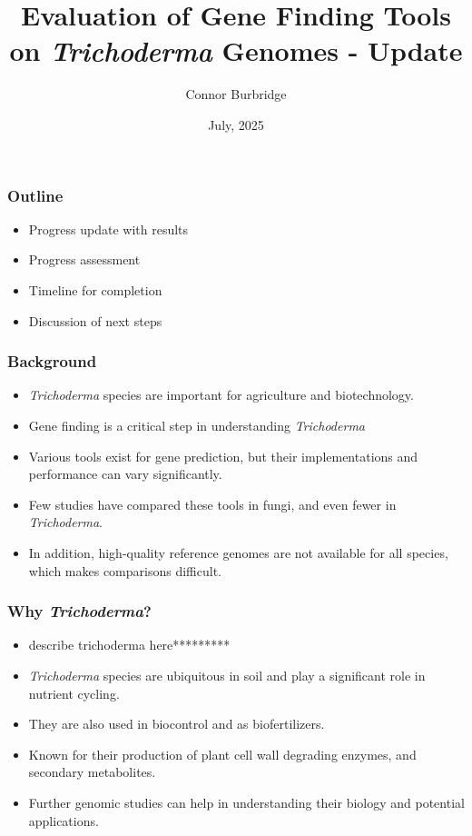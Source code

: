 \documentclass[t]{beamer}
\title{Evaluation of Gene Finding Tools on \textit{Trichoderma} Genomes - Update}
\date{July, 2025}
\author{Connor Burbridge}
\institute{Department of Computer Science}
\begin{document}
\begin{frame}
	\titlepage
\end{frame}

\begin{frame}
	\frametitle{Outline} 

	\begin{itemize}
		\item Progress update with results
		\item Progress assessment
		\item Timeline for completion	
		\item Discussion of next steps
	\end{itemize}
\end{frame}

\begin{frame}
	\frametitle{Background} 
	\begin{itemize}
		\item \textit{Trichoderma} species are important for agriculture and biotechnology.
		\item Gene finding is a critical step in understanding \textit{Trichoderma}
		\item Various tools exist for gene prediction, but their implementations and performance can vary significantly.
		\item Few studies have compared these tools in fungi, and even fewer in \textit{Trichoderma}.
		\item In addition, high-quality reference genomes are not available for all species, which makes comparisons difficult.
	\end{itemize}
\end{frame}

\begin{frame}
	\frametitle{Why \textit{Trichoderma}?}
	\begin{itemize}
		\item describe trichoderma here*********
		\item \textit{Trichoderma} species are ubiquitous in soil and play a significant role in nutrient cycling.
		\item They are also used in biocontrol and as biofertilizers.
		\item Known for their production of plant cell wall degrading enzymes, and secondary metabolites.
		\item Further genomic studies can help in understanding their biology and potential applications.
	\end{itemize}
\end{frame}
\end{document}
